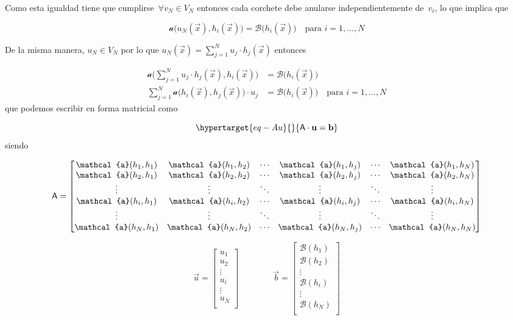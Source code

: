 \documentclass[
  12pt,
  a4paper,
  table]{scrbook}
\theoremstyle{plain}
\theoremstyle{definition}
\theoremstyle{plain}
\theoremstyle{plain}
\theoremstyle{remark}
\begin{document}
Como esta igualdad tiene que cumplirse~\(\forall v_N \in V_N\) entonces
cada corchete debe anularse independientemente de~\(v_i\), lo que
implica que

\[
\mathcal{a} \Big(u_N(\vec{x}), h_i\left(\vec{x}\right)\Big) = \mathcal{B} \Big(h_i\left(\vec{x}\right)\Big)
\quad \text{para $i=1,\dots,N$}
\]

De la misma manera, \(u_N \in V_N\) por lo que
\(u_N(\vec{x}) = \sum_{j=1}^N u_j \cdot h_j(\vec{x})\) entonces

\[
\begin{aligned}
\mathcal{a} \Big(\sum_{j=1}^N u_j \cdot h_j(\vec{x}), h_i\left(\vec{x}\right)\Big) &= \mathcal{B} \Big(h_i\left(\vec{x}\right)\Big) \\
\sum_{j=1}^N \mathcal{a} \Big(h_i(\vec{x}), h_j\left(\vec{x}\right)\Big) \cdot u_j  &= \mathcal{B} \Big(h_i\left(\vec{x}\right)\Big)
\quad \text{para $i=1,\dots,N$} 
\end{aligned}
\] que podemos escribir en forma matricial como

\begin{equation}\protect\hypertarget{eq-Au}{}{
\mat{A} \cdot \vec{u} = \vec{b}
}\label{eq-Au}\end{equation} siendo

\[
\mat{A} =
\begin{bmatrix}
\mathcal{a}(h_1,h_1) & \mathcal{a}(h_1,h_2) & \cdots & \mathcal{a}(h_1,h_j) & \cdots & \mathcal{a}(h_1,h_N) \\
\mathcal{a}(h_2,h_1) & \mathcal{a}(h_2,h_2) & \cdots & \mathcal{a}(h_2,h_j) & \cdots & \mathcal{a}(h_2,h_N) \\
\vdots               & \vdots               & \ddots & \vdots               & \ddots & \vdots \\
\mathcal{a}(h_i,h_1) & \mathcal{a}(h_i,h_2) & \cdots & \mathcal{a}(h_i,h_j) & \cdots & \mathcal{a}(h_i,h_N) \\
\vdots               & \vdots               & \ddots & \vdots               & \ddots & \vdots \\
\mathcal{a}(h_N,h_1) & \mathcal{a}(h_N,h_2) & \cdots & \mathcal{a}(h_N,h_j) & \cdots & \mathcal{a}(h_N,h_N) \\
\end{bmatrix}
\]

\[
\vec{u} = 
\begin{bmatrix}
u_1 \\
u_2 \\
\vdots \\
u_i \\
\vdots \\
u_N \\
\end{bmatrix}
\quad\quad\quad\quad
\vec{b} = 
\begin{bmatrix}
\mathcal{B}(h_1) \\
\mathcal{B}(h_2) \\
\vdots \\
\mathcal{B}(h_i) \\
\vdots \\
\mathcal{B}(h_N) \\
\end{bmatrix}
\]
\end{document}
